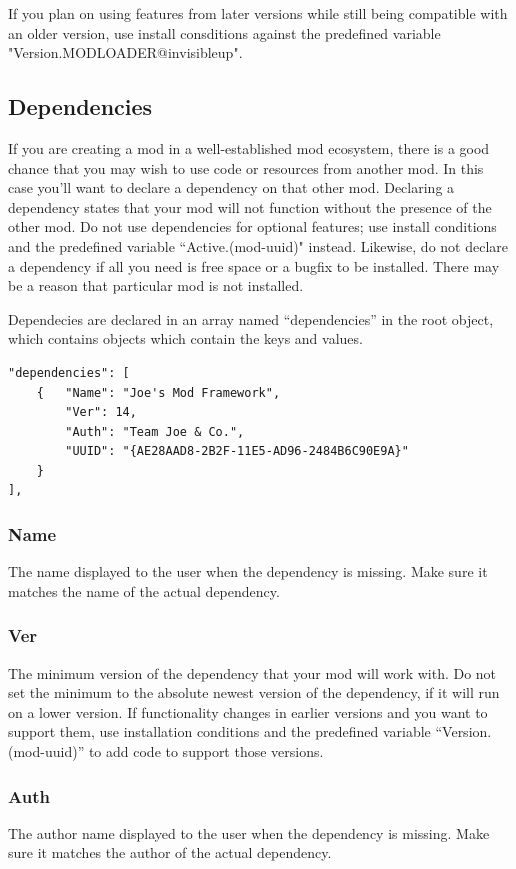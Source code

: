 \documentclass[12pt,a4paper,notitlepage]{article}
\begin{document}
If you plan on using features from later versions while still being compatible with an older version, use install consditions against the predefined variable "Version.MODLOADER@invisibleup".

\subsection{Dependencies}
\label{subsec:create-depend}
If you are creating a mod in a well-established mod ecosystem, there is a good chance that you may wish to use code or resources from another mod. In this case you'll want to declare a dependency on that other mod. Declaring a dependency states that your mod will not function without the presence of the other mod. Do not use dependencies for optional features; use install conditions and the predefined variable ``Active.(mod-uuid)" instead. Likewise, do not declare a dependency if all you need is free space or a bugfix to be installed. There may be a reason that particular mod is not installed.

Dependecies are declared in an array named ``dependencies'' in the root object, which contains objects which contain the keys and values.

\begin{lstlisting}[breaklines=true]
"dependencies": [
	{	"Name": "Joe's Mod Framework",
		"Ver": 14,
		"Auth": "Team Joe & Co.",
		"UUID": "{AE28AAD8-2B2F-11E5-AD96-2484B6C90E9A}"
	}
],
\end{lstlisting}

\subsubsection{Name}
\label{subsubsec:create-depend-name}
The name displayed to the user when the dependency is missing. Make sure it matches the name of the actual dependency.

\subsubsection{Ver}
\label{subsubsec:create-depend-ver}
The minimum version of the dependency that your mod will work with. Do not set the minimum to the absolute newest version of the dependency, if it will run on a lower version. If functionality changes in earlier versions and you want to support them, use installation conditions and the predefined variable ``Version.(mod-uuid)'' to add code to support those versions.

\subsubsection{Auth}
The author name displayed to the user when the dependency is missing. Make sure it matches the author of the actual dependency.
\end{document}
